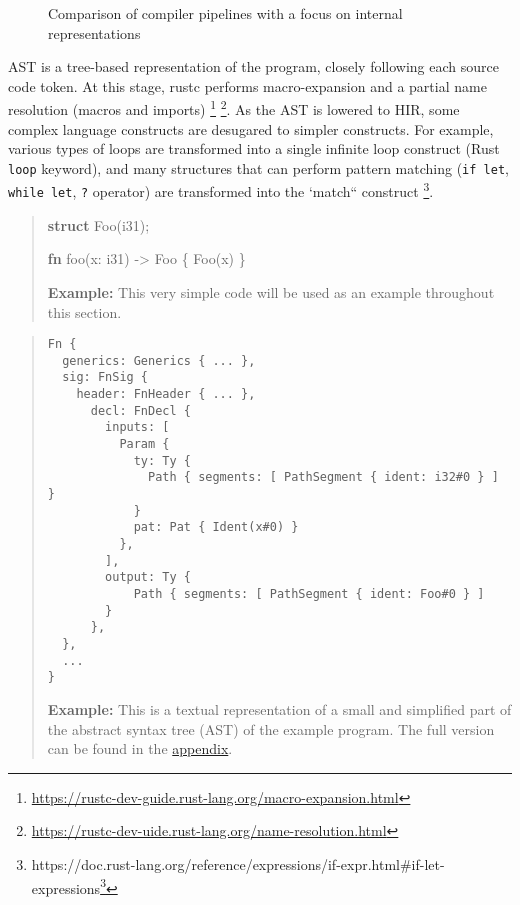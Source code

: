 \documentclass[
  11pt,
  twoside,symmetric]{report}
\newenvironment{Shaded}{}{}
\newcommand{\KeywordTok}[1]{\textbf{#1}}
\newcommand{\NormalTok}[1]{#1}
\newcommand{\OperatorTok}[1]{#1}
\DeclareRobustCommand{\href}[2]{#2\footnote{\url{#1}}}
\begin{document}
\begin{figure}
\centering

\caption{Comparison of compiler pipelines with a focus on internal
representations}
\end{figure}

AST is a tree-based representation of the program, closely following
each source code token. At this stage, rustc performs macro-expansion
and a partial name resolution (macros and imports)
 \footnote{\url{https://rustc-dev-guide.rust-lang.org/macro-expansion.html}}
\footnote{\url{https://rustc-dev-uide.rust-lang.org/name-resolution.html}}.
As the AST is lowered to HIR, some complex language constructs are
desugared to simpler constructs. For example, various types of loops are
transformed into a single infinite loop construct (Rust \texttt{loop}
keyword), and many structures that can perform pattern matching
(\texttt{if\ let}, \texttt{while\ let}, \texttt{?} operator) are
transformed into the `match`` construct
\footnote{\href{https://doc.rust-lang.\%20org/reference/expressions/if-expr.html\#if-let-expressions}{https://doc.rust-lang.org/reference/expressions/if-expr.html\#if-let-expressions}}.

\begin{quote}
\begin{Shaded}
\begin{Highlighting}[]
\KeywordTok{struct}\NormalTok{ Foo(i31)}\OperatorTok{;}

\KeywordTok{fn}\NormalTok{ foo(x}\OperatorTok{:}\NormalTok{ i31) }\OperatorTok{{-}\textgreater{}}\NormalTok{ Foo }\OperatorTok{\{}
\NormalTok{    Foo(x)}
\OperatorTok{\}}
\end{Highlighting}
\end{Shaded}

\textbf{Example:} This very simple code will be used as an example
throughout this section.
\end{quote}

\begin{quote}
\begin{verbatim}
Fn {
  generics: Generics { ... },
  sig: FnSig {
    header: FnHeader { ... },
      decl: FnDecl {
        inputs: [
          Param {
            ty: Ty {
              Path { segments: [ PathSegment { ident: i32#0 } ] }
            }
            pat: Pat { Ident(x#0) }
          },
        ],
        output: Ty {
            Path { segments: [ PathSegment { ident: Foo#0 } ]
        }
      },
  },
  ... 
}
\end{verbatim}

\hfill\break
\textbf{Example:} This is a textual representation of a small and
simplified part of the abstract syntax tree (AST) of the example
program. The full version can be found in the
\hyperref[abstract-syntax-tree-ast]{appendix}.
\end{quote}
\end{document}
